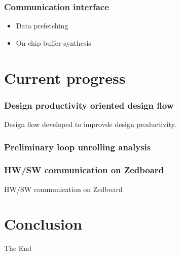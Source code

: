 \documentclass{beamer}
\begin{document}
\begin{frame}

\frametitle{Communication interface}
\begin{itemize}
\item Data prefetching
\item On chip buffer synthesis
\end{itemize}

\end{frame}


\section{Current progress}
\begin{frame}

\frametitle{Design productivity oriented design flow}
Design flow developed to improvde design productivity.

\end{frame}

\begin{frame}

\frametitle{Preliminary loop unrolling analysis}
\end{frame}

\begin{frame}

\frametitle{HW/SW communication on Zedboard}
HW/SW communication on Zedboard

\end{frame}

\section{Conclusion}
\begin{frame}
\Huge{\centerline{The End}}
\end{frame}

\end{document}
